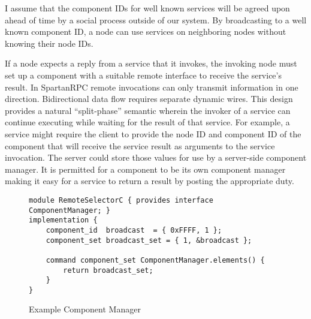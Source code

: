 I assume that the component IDs for well known services will be agreed upon ahead of time by a
social process outside of our system. By broadcasting to a well known component ID, a node can
use services on neighboring nodes without knowing their node IDs.

If a node expects a reply from a service that it invokes, the invoking node must set up a
component with a suitable remote interface to receive the service's result. In SpartanRPC remote
invocations can only transmit information in one direction. Bidirectional data flow requires
separate dynamic wires. This design provides a natural ``split-phase'' semantic wherein the
invoker of a service can continue executing while waiting for the result of that service. For
example, a service might require the client to provide the node ID and component ID of the
component that will receive the service result as arguments to the service invocation. The
server could store those values for use by a server-side component manager. It is permitted for
a component to be its own component manager making it easy for a service to return a result by
posting the appropriate duty.

\begin{figure}[!t]
\begin{textbox}{4.0in}
\begin{Verbatim}[fontsize=\small]
module RemoteSelectorC { provides interface ComponentManager; }
implementation {
    component_id  broadcast  = { 0xFFFF, 1 };
    component_set broadcast_set = { 1, &broadcast };

    command component_set ComponentManager.elements() {
        return broadcast_set;
    }
}
\end{Verbatim}
\end{textbox}
\caption{Example Component Manager}
\label{figure-example-componentmanager}
\end{figure}

%

